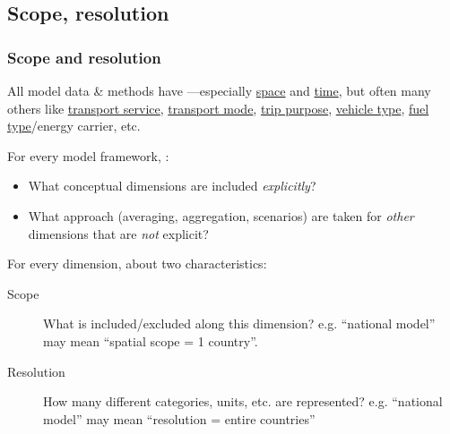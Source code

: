 \documentclass[12pt,aspectratio=169]{beamer}
\begin{document}
\subsection{Scope, resolution}
\begin{frame}
\frametitle{Scope and resolution}
All model data & methods have —especially \uline{space} and \uline{time}, but often many others like \uline{transport service}, \uline{transport mode}, \uline{trip purpose}, \uline{vehicle type}, \uline{fuel type}/energy carrier, etc.

\medskip
For every model framework, :
\begin{itemize}
  \item What conceptual dimensions are included \emph{explicitly}?
  \item What approach (averaging, aggregation, scenarios) are taken for \emph{other} dimensions that are \emph{not} explicit?
\end{itemize}

\medskip
For every dimension,  about two characteristics:
\begin{description}
  \item [Scope] What is included/excluded along this dimension?
    e.g. “national model” may mean “spatial scope = 1 country”.
  \item [Resolution] How many different categories, units, etc. are represented?
    e.g. “national model” may mean “resolution = entire countries”
\end{description}

\end{frame}
\end{document}

